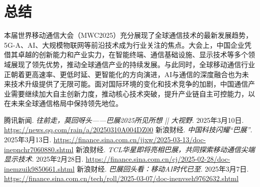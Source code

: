 \documentclass{article}
\begin{document}
\section*{总结}
本届世界移动通信大会（MWC2025）充分展现了全球通信技术的最新发展趋势，5G-A、AI、大规模物联网等前沿技术成为行业关注的焦点。大会上，中国企业凭借其卓越的创新能力和产业实力，在智能终端、通信基础设施、显示技术等多个领域展现了领先优势，推动全球通信产业的持续发展。与此同时，全球移动通信行业正朝着更高速率、更低时延、更智能化的方向演进，AI与通信的深度融合也为未来技术升级提供了无限可能。面对国际环境的变化和技术竞争的加剧，中国通信产业需要继续加大自主创新力度，推动核心技术突破，提升产业链自主可控能力，以在未来全球通信格局中保持领先地位。
\newpage
\begin{thebibliography}{9}
     腾讯新闻. \textit{往前走，莫回呀头——巴展2025所见所想 || 大视野}. 2025年3月10日. \url{https://news.qq.com/rain/a/20250310A004DZ00}
     新浪财经. \textit{中国科技闪耀“巴展”}. 2025年3月13日. \url{https://finance.sina.com.cn/jjxw/2025-03-13/doc-inepnchr7060880.shtml}
     新浪财经. \textit{TCL华星即将亮相巴展，共同探索移动通信尖端显示技术}. 2025年2月28日. \url{https://finance.sina.com.cn/cj/2025-02-28/doc-inemzuik9850661.shtml}
     新浪财经. \textit{巴展回头看：移动AI时代已至}. 2025年3月7日. \url{https://finance.sina.com.cn/tech/roll/2025-03-07/doc-inenvseh9762632.shtml}
\end{thebibliography}
\end{document}
